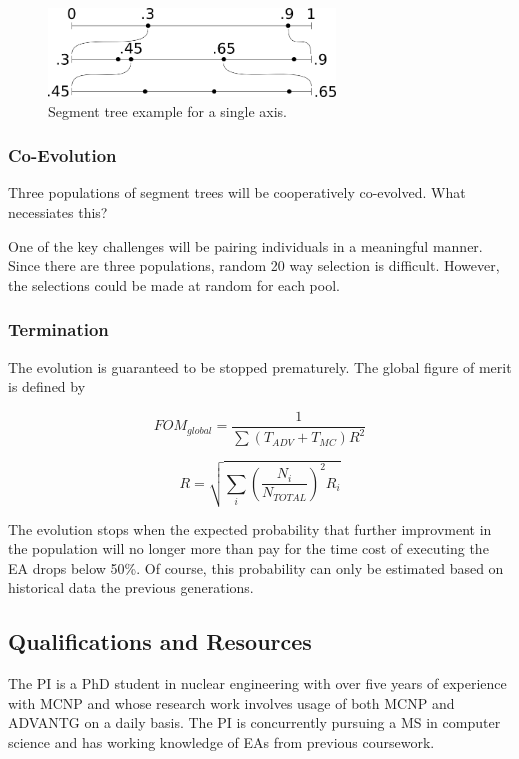 \documentclass{article}
\begin{document}
\begin{figure}
    \centering
    \includegraphics[width=3.0in]{treeex}
    \caption{Segment tree example for a single axis.}
    \label{fig:segtree}
\end{figure}

\subsubsection{Co-Evolution}
Three populations of segment trees will be cooperatively co-evolved. What necessiates this? 

One of the key challenges will be pairing individuals in a meaningful manner. Since there are three populations, random 20 way selection is difficult. However, the selections could be made at random for each pool.

\subsubsection{Termination}
The evolution is guaranteed to be stopped prematurely. The global figure of merit is defined by

\begin{equation}
FOM_{global} = \frac{1}{\sum \left( T_{ADV} + T_{MC} \right) R^2}
\end{equation}

\begin{equation}\label{eq:stddev_combine}
R = \sqrt{\sum_i \left( \frac{N_i}{N_{TOTAL}} \right)^2 R_i}
\end{equation}

The evolution stops when the expected probability that further improvment in the population will no longer more than pay for the time cost of executing the EA drops below 50\%. Of course, this probability can only be estimated based on historical data the previous generations.

\subsection{Qualifications and Resources}\label{sec:b4}
The PI is a PhD student in nuclear engineering with over five years of experience with MCNP and whose research work involves usage of both MCNP and ADVANTG on a daily basis. The PI is concurrently pursuing a MS in computer science and has working knowledge of EAs from previous coursework.
\end{document}

